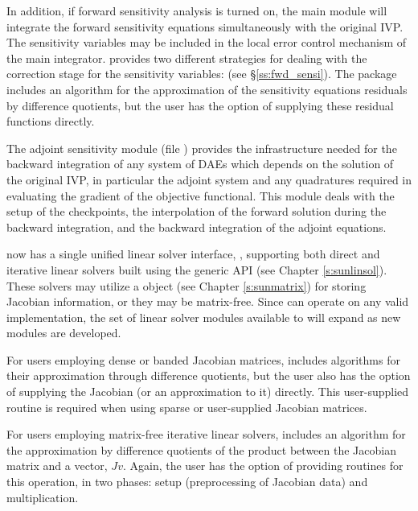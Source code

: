 In addition, if forward sensitivity analysis is turned on, the main module
will integrate the forward sensitivity equations simultaneously with the original
IVP. The sensitivity variables may be included in the local error control
mechanism of the main integrator.
{\idas} provides two different strategies for dealing with the correction
stage for the sensitivity variables:  
(see \S\ref{ss:fwd_sensi}).
The {\idas} package includes an algorithm for the approximation of the
sensitivity equations residuals by difference quotients, but the user has
the option of supplying these residual functions directly.

The adjoint sensitivity module (file ) provides the infrastructure needed for the
backward integration of any system of DAEs which depends on the solution
of the original IVP, in particular the adjoint system and any quadratures required
in evaluating the gradient of the objective functional.  This module deals with
the setup of the checkpoints, the interpolation of the forward solution during
the backward integration, and the backward integration of the adjoint equations.

{\idas} now has a single unified linear solver interface, {\idals},
supporting both direct and iterative linear solvers built using the
generic {\sunlinsol} API (see Chapter \ref{s:sunlinsol}).  These
solvers may utilize a {\sunmatrix} object (see Chapter
\ref{s:sunmatrix}) for storing Jacobian information, or they may be
matrix-free.  Since {\idas} can operate on any valid {\sunlinsol}
implementation, the set of linear solver modules available to {\idas}
will expand as new {\sunlinsol} modules are developed.

For users employing dense or banded Jacobian matrices, {\idals}
includes algorithms for their approximation through difference
quotients, but the user also has the option of supplying the Jacobian
(or an approximation to it) directly.  This user-supplied
routine is required when using sparse or user-supplied Jacobian
matrices.

For users employing matrix-free iterative linear solvers, {\idals}
includes an algorithm for the approximation by difference quotients of
the product between the Jacobian matrix and a vector, $Jv$. Again, the
user has the option of providing routines for this operation, in two
phases: setup (preprocessing of Jacobian data) and multiplication.

